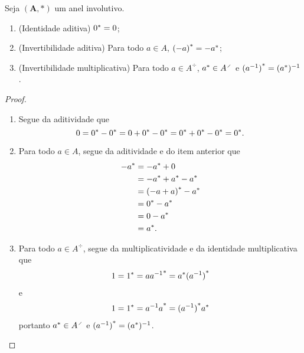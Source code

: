 \begin{proposition}
Seja $(\bm A,*)$ um anel involutivo.
	\begin{enumerate}
	\item (Identidade aditiva) ${0}^{\ast} = 0$;
	\item (Invertibilidade aditiva) Para todo $a \in A$, ${(-a)}^{\ast} = -{a}^{\ast}$;
	\item (Invertibilidade multiplicativa) Para todo $a \in A^{\div}$, $\invol{a} \in A^{\div}$ e ${(a^{-1})}^{\ast} = ({a}^{\ast})^{-1}$.
	\end{enumerate}
\end{proposition}
\begin{proof}
	\begin{enumerate}
	\item Segue da aditividade que
		\begin{equation*}
		0 = {0}^{\ast} - {0}^{\ast} = {0+0}^{\ast} - {0}^{\ast} = {0}^{\ast} + {0}^{\ast} - {0}^{\ast} = {0}^{\ast}.
		\end{equation*}

	\item Para todo $a \in A$, segue da aditividade e do item anterior que
		\begin{align*}
		{-a}^{\ast} &= {-a}^{\ast} + 0 \\
			&= {-a}^{\ast} + {a}^{\ast} - {a}^{\ast} \\
			&= {(-a+a)}^{\ast} - {a}^{\ast} \\
			&= {0}^{\ast} - {a}^{\ast} \\
			&= 0 - {a}^{\ast} \\
			&= {a}^{\ast}.
		\end{align*}

	\item Para todo $a \in A^{\div}$, segue da multiplicatividade e da identidade multiplicativa que
		\begin{align*}
		1 = {1}^{\ast} = {a a^{-1}}^{\ast} = {a}^{\ast}{(a^{-1})}^{\ast}
		\end{align*}
	e
		\begin{align*}
		1 = {1}^{\ast} = {a^{-1} a}^{\ast} = {(a^{-1})}^{\ast}{a}^{\ast}
		\end{align*}
	portanto $\invol{a} \in A^{\div}$ e ${(a^{-1})}^{\ast} = ({a}^{\ast})^{-1}$.
	\end{enumerate}
\end{proof}

